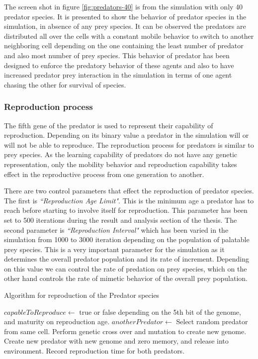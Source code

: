 \documentclass[letterpaper]{article}
\numberwithin{equation}{section}
\begin{document}
The screen shot in figure \ref{fig:predators-40} is from the simulation with only 40 predator species. It is presented to show the behavior of predator species in the simulation, in absence of any prey species. It can be observed the predators are distributed all over the cells with a constant mobile behavior to switch to another neighboring cell depending on the one containing the least number of predator and also most number of prey species. This behavior of predator has been designed to enforce the predatory behavior of these agents and also to have increased predator prey interaction in the simulation in terms of one agent chasing the other for survival of species. 

\subsubsection{Reproduction process}
The  fifth gene of the predator is used to represent their capability of reproduction.  Depending on its binary value a predator in the simulation will or will not be able to reproduce. The reproduction process for predators is similar to prey species. As the learning capability of predators do not have any genetic representation, only the mobility behavior and reproduction capability takes effect in the reproductive process from one generation to another. 

There are two control parameters that effect the reproduction of predator species. The first is \textsl{``Reproduction Age Limit"}. This is the minimum age a predator has to reach before starting to involve itself for reproduction. This parameter has been set to 500 iterations during the result and analysis section of the thesis. The second parameter is \textsl{``Reproduction Interval"} which has been varied in the simulation from 1000 to 3000 iteration depending on the population of palatable prey species. This is a very important parameter for the simulation as it determines the overall predator population and its rate of increment. Depending on this value we can control the rate of predation on prey species, which on the other hand controls the rate of mimetic behavior of the overall prey population.

\begin{algorithm}[H]
	\caption{Algorithm for reproduction of the Predator species}
	\label{algo:algorithm-reproduction-predator}
	\begin{algorithmic}
			\STATE $capableToReproduce \gets$ true or false depending on the 5th bit of the genome, and maturity on reproduction age.
				\STATE $anotherPredator \gets$ Select random predator from same cell.
					\STATE Perform genetic cross over and mutation to create new genome.
					\STATE Create new predator with new genome and zero memory, and release into environment.
					\STATE Record reproduction time for both predators.
				\ENDIF
			\ENDIF
		\ENDFOR
	\end{algorithmic}
\end{algorithm}
\end{document}
